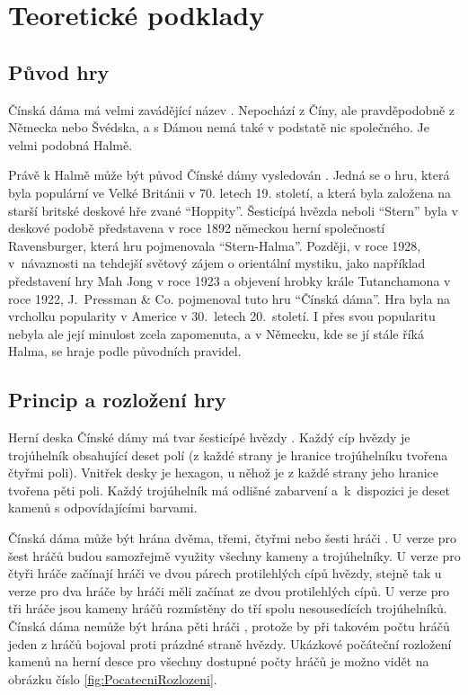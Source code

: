 \chapter{Teoretické podklady}
\section{Původ hry}
Čínská dáma má velmi zavádějící název \cite{puvod-cz}. Nepochází z Číny, ale pravděpodobně z Německa nebo Švédska, a s Dámou nemá také v podstatě nic společného. Je velmi podobná Halmě. 

Právě k Halmě může být původ Čínské dámy vysledován \cite{puvod-en}. Jedná se o hru, která byla populární ve Velké Británii v 70. letech 19. století, a která byla založena na starší britské deskové hře zvané \enquote{Hoppity}. Šesticípá hvězda neboli \enquote{Stern} byla v deskové podobě představena v roce 1892 německou herní společností Ravensburger, která hru pojmenovala \enquote{Stern-Halma}. Později, v roce 1928, v~návaznosti na tehdejší světový zájem o orientální mystiku, jako například představení hry Mah Jong v roce 1923 a objevení hrobky krále Tutanchamona v roce 1922, J.~Pressman \& Co. pojmenoval tuto hru \enquote{Čínská dáma}. Hra byla na vrcholku popularity v Americe v 30.\ letech 20.\ století. I přes svou popularitu nebyla ale její minulost zcela zapomenuta, a v Německu, kde se jí stále říká Halma, se hraje podle původních pravidel.

\section{Princip a rozložení hry}
Herní deska Čínské dámy má tvar šesticípé hvězdy \cite{pravidla}. Každý cíp hvězdy je trojúhelník obsahující deset polí (z každé strany je hranice trojúhelníku tvořena čtyřmi poli). Vnitřek desky je hexagon, u něhož je z každé strany jeho hranice tvořena pěti poli. Každý trojúhelník má odlišné zabarvení a~k~dispozici je deset kamenů s odpovídajícími barvami.

Čínská dáma může být hrána dvěma, třemi, čtyřmi nebo šesti hráči \cite{pravidla}. U verze pro šest hráčů budou samozřejmě využity všechny kameny a trojúhelníky. U verze pro čtyři hráče začínají hráči ve dvou párech protilehlých cípů hvězdy, stejně tak u verze pro dva hráče by hráči měli začínat ze dvou protilehlých cípů. U verze pro tři hráče jsou kameny hráčů rozmístěny do tří spolu nesousedících trojúhelníků. Čínská dáma nemůže být hrána pěti hráči \cite{pravidla2}, protože by při takovém počtu hráčů jeden z hráčů bojoval proti prázdné straně hvězdy. Ukázkové počáteční rozložení kamenů na herní desce pro všechny dostupné počty hráčů je možno vidět na obrázku číslo \ref{fig:PocatecniRozlozeni}.


